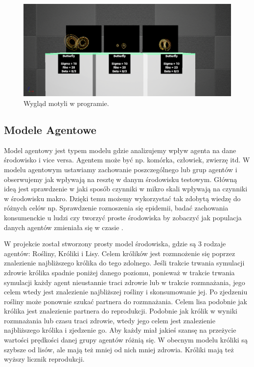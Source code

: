 \documentclass[a4paper,12pt,reqno]{article}
\begin{document}
\begin{figure}[H]%
\centering
\includegraphics[width=0.9\columnwidth]{graphics/butterfly/ButterflyInUE_1.png}
\caption{Wygląd motyli w programie.
\label{ButterflyEffectUE4}}%
%
\qquad
\end{figure}  

\newpage
\subsection{Modele Agentowe}

Model agentowy jest typem modelu gdzie analizujemy wpływ agenta na dane środowisko i vice versa. Agentem może być np. komórka, człowiek, zwierzę itd. W modelu agentowym ustawiamy zachowanie poszczególnego lub grup agentów i obserwujemy jak wpływają na resztę w danym środowisku testowym. Główną ideą jest sprawdzenie w jaki sposób czynniki w mikro skali wpływają na czynniki w środowisku makro. Dzięki temu możemy wykorzystać tak zdobytą wiedzę do różnych celów np. Sprawdzenie roznoszenia się epidemii, badać zachowania konsumenckie u ludzi czy tworzyć proste środowiska  by zobaczyć jak populacja danych agentów zmieniała się w czasie \cite{agent_examples}. 

W projekcie został stworzony prosty model środowiska, gdzie są 3 rodzaje agentów: Rośliny, Króliki i Lisy. Celem królików jest rozmnożenie się poprzez znalezienie najbliższego królika do tego zdolnego. Jeśli trakcie trwania symulacji zdrowie królika spadnie poniżej danego poziomu, ponieważ w trakcie trwania symulacji każdy agent nieustannie traci zdrowie lub w trakcie rozmnażania, jego celem wtedy jest znalezienie najbliższej rośliny i skonsumowanie jej. Po zjedzeniu rośliny może ponownie szukać partnera do rozmnażania.  Celem lisa podobnie jak królika jest znalezienie partnera do reprodukcji. Podobnie jak królik w wyniki rozmnażania lub czasu traci zdrowie, wtedy jego celem jest znalezienie najbliższego królika i zjedzenie go. Aby każdy miał jakieś szansę na przeżycie wartości prędkości danej grupy agentów różnią się. W obecnym modelu króliki są szybsze od lisów, ale mają też mniej od nich mniej zdrowia. Króliki mają też wyższy licznik reprodukcji.
\end{document}
